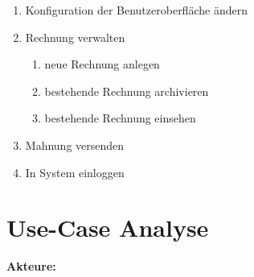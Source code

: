 \begin{enumerate}[itemsep= -0.25 cm]
\begin{enumerate}[itemsep= -0.25 cm]
    \end{enumerate}
    \item Konfiguration der Benutzeroberfläche ändern
    \item Rechnung verwalten
    \begin{enumerate}[itemsep= -0.25 cm]
        \item neue Rechnung anlegen
        \item bestehende Rechnung archivieren
        \item bestehende Rechnung einsehen
    \end{enumerate}
    \item Mahnung versenden
    \item In System einloggen
\end{enumerate}

\section{Use-Case Analyse}

\textbf{Akteure:}


